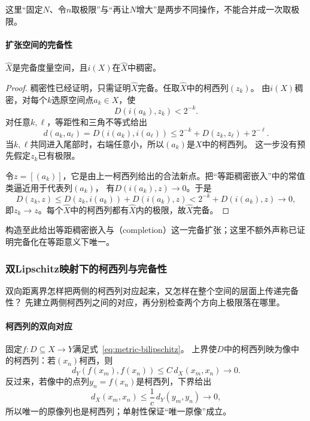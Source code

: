 这里“固定$N$、令$n$取极限”与“再让$N$增大”是两步不同操作，不能合并成一次取极限。

\paragraph{扩张空间的完备性}

\begin{theorem}[完备化]
\label{thm:metric-completion}
$\widehat X$是完备度量空间，且$i(X)$在$\widehat X$中稠密。
\end{theorem}

\begin{proof}
稠密性已经证明，只需证明$\widehat X$完备。任取$\widehat X$中的柯西列$(z_k)$。
由$i(X)$稠密，对每个$k$选原空间点$a_k\in X$，使
\[
  D(i(a_k),z_k)<2^{-k}.
\]
对任意$k,\ell$，等距性和三角不等式给出
\[
  d(a_k,a_\ell)=D(i(a_k),i(a_\ell))
  \leq 2^{-k}+D(z_k,z_\ell)+2^{-\ell}.
\]
当$k,\ell$共同进入尾部时，右端任意小，所以$(a_k)$是$X$中的柯西列。
这一步没有预先假定$z_k$已有极限。

令$z=[(a_k)]$，它是由上一柯西列给出的合法新点。把“等距稠密嵌入”中的常值类逼近用于代表列$(a_k)$，
有$D(i(a_k),z)\to0$。于是
\[
  D(z_k,z)\leq D(z_k,i(a_k))+D(i(a_k),z)<2^{-k}+D(i(a_k),z)\to0,
\]
即$z_k\to z$。每个$\widehat X$中的柯西列都有$\widehat X$内的极限，故$\widehat X$完备。
\end{proof}

构造至此给出等距稠密嵌入与（completion）这一完备扩张；这里不额外声称已证明完备化在等距意义下唯一。

\subsubsection{双Lipschitz映射下的柯西列与完备性}
\label{sec:metric-map-cauchy-preservation}

双向距离界怎样把两侧的柯西列对应起来，又怎样在整个空间的层面上传递完备性？
先建立两侧柯西列之间的对应，再分别检查两个方向上极限落在哪里。

\paragraph{柯西列的双向对应}

固定$f:D\subseteq X\to Y$满足式~\eqref{eq:metric-bilipschitz}。
上界使$D$中的柯西列映为像中的柯西列：若$(x_n)$柯西，则
\[
  d_Y(f(x_m),f(x_n))\leq C\,d_X(x_m,x_n)\to0.
\]
反过来，若像中的点列$y_n=f(x_n)$是柯西列，下界给出
\[
  d_X(x_m,x_n)\leq\frac1c\,d_Y(y_m,y_n)\to0,
\]
所以唯一的原像列也是柯西列；单射性保证“唯一原像”成立。

